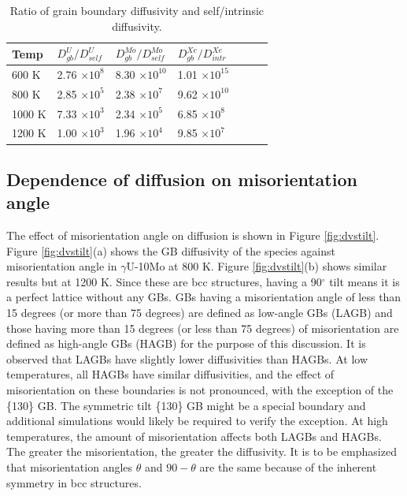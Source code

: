\documentclass{elsarticle}
\begin{document}
\begin{table}[!ht]
\centering
\caption{Ratio of grain boundary diffusivity and self/intrinsic diffusivity.}
\label{tab:enhance}
\begin{tabular}{lllllll}
\toprule
Temp   & $D^U_{gb}/D^U_{self}$
       & $D^{Mo}_{gb}/D^{Mo}_{self}$
       & $D^{Xe}_{gb}/D^{Xe}_{intr}$ \\
\midrule
600 K  & 2.76 $\times 10^8$ & 8.30 $\times 10^{10}$ & 1.01 $\times 10^{15}$ \\
800 K  & 2.85 $\times 10^5$ & 2.38 $\times 10^7$    & 9.62 $\times 10^{10}$ \\
1000 K & 7.33 $\times 10^3$ & 2.34 $\times 10^5$    & 6.85 $\times 10^8$  \\
1200 K & 1.00 $\times 10^3$ & 1.96 $\times 10^4$    & 9.85 $\times 10^7$  \\
\bottomrule
\end{tabular}
\end{table}


\FloatBarrier
\subsection{Dependence of diffusion on misorientation angle}

The effect of misorientation angle on diffusion is shown in Figure \ref{fig:dvstilt}. Figure \ref{fig:dvstilt}(a) shows the GB diffusivity of the species against misorientation angle in $\gamma$U-10Mo at 800 K. Figure \ref{fig:dvstilt}(b) shows similar results but at 1200 K. Since these are bcc structures, having a 90$^{\circ}$ tilt means it is a perfect lattice without any GBs. GBs having a misorientation angle of less than 15 degrees (or more than 75 degrees) are defined as low-angle GBs (LAGB) and those having more than 15 degrees (or less than 75 degrees) of misorientation are defined as high-angle GBs (HAGB) for the purpose of this discussion. It is observed that LAGBs have slightly lower diffusivities than HAGBs. At low temperatures, all HAGBs have similar diffusivities, and the effect of misorientation on these boundaries is not pronounced, with the exception of the \{130\} GB. The symmetric tilt \{130\} GB might be a special boundary and additional simulations would likely be required to verify the exception. At high temperatures, the amount of misorientation affects both LAGBs and HAGBs. The greater the misorientation, the greater the diffusivity. It is to be emphasized that misorientation angles $\theta$ and $90-\theta$ are the same because of the inherent symmetry in bcc structures.
\end{document}
